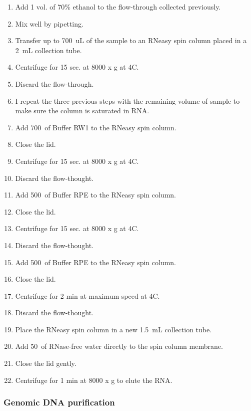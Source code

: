 \begin{enumerate}
\item Add 1 vol. of 70\% ethanol to the flow-through collected previously. 
\item Mix well by pipetting.
\item Transfer up to 700~uL of the sample to an RNeasy spin column placed in a 2~mL collection tube.
\item Centrifuge for 15 sec. at 8000 x g at 4\degree C.
\item Discard the flow-through.
\item I repeat the three previous steps with the remaining volume of sample to make sure the column is saturated in RNA.
\item Add 700~\uL of Buffer RW1 to the RNeasy spin column.
\item Close the lid.
\item Centrifuge for 15 sec. at 8000 x g at 4\degree C.
\item Discard the flow-thought.
\item Add 500~\uL of Buffer RPE to the RNeasy spin column.
\item Close the lid.
\item Centrifuge for 15 sec. at 8000 x g at 4\degree C.
\item Discard the flow-thought.
\item Add 500~\uL of Buffer RPE to the RNeasy spin column.
\item Close the lid.
\item Centrifuge for 2 min at maximum speed at 4\degree C.
\item Discard the flow-thought.
\item Place the RNeasy spin column in a new 1.5~mL collection tube.
\item Add 50~\uL of RNase-free water directly to the spin column membrane. 
\item Close the lid gently.
\item Centrifuge for 1 min at 8000 x g to elute the RNA.
\end{enumerate}

\subsubsection{Genomic DNA purification}

